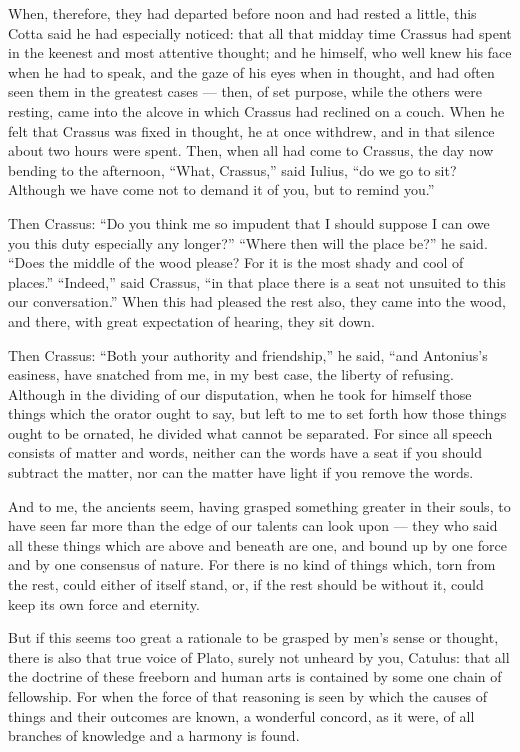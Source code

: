  When, therefore, they had departed before noon and had rested a little, this Cotta said he had especially noticed: that all that midday time Crassus had spent in the keenest and most attentive thought; and he himself, who well knew his face when he had to speak, and the gaze of his eyes when in thought, and had often seen them in the greatest cases — then, of set purpose, while the others were resting, came into the alcove in which Crassus had reclined on a couch. When he felt that Crassus was fixed in thought, he at once withdrew, and in that silence about two hours were spent. Then, when all had come to Crassus, the day now bending to the afternoon, ``What, Crassus,'' said Iulius, ``do we go to sit? Although we have come not to demand it of you, but to remind you.''

 Then Crassus: ``Do you think me so impudent that I should suppose I can owe you this duty especially any longer?'' ``Where then will the place be?'' he said. ``Does the middle of the wood please? For it is the most shady and cool of places.'' ``Indeed,'' said Crassus, ``in that place there is a seat not unsuited to this our conversation.'' When this had pleased the rest also, they came into the wood, and there, with great expectation of hearing, they sit down.

 Then Crassus: ``Both your authority and friendship,'' he said, ``and Antonius's easiness, have snatched from me, in my best case, the liberty of refusing. Although in the dividing of our disputation, when he took for himself those things which the orator ought to say, but left to me to set forth how those things ought to be ornated, he divided what cannot be separated. For since all speech consists of matter and words, neither can the words have a seat if you should subtract the matter, nor can the matter have light if you remove the words.

 And to me, the ancients seem, having grasped something greater in their souls, to have seen far more than the edge of our talents can look upon — they who said all these things which are above and beneath are one, and bound up by one force and by one consensus of nature. For there is no kind of things which, torn from the rest, could either of itself stand, or, if the rest should be without it, could keep its own force and eternity.

 But if this seems too great a rationale to be grasped by men's sense or thought, there is also that true voice of Plato, surely not unheard by you, Catulus: that all the doctrine of these freeborn and human arts is contained by some one chain of fellowship. For when the force of that reasoning is seen by which the causes of things and their outcomes are known, a wonderful concord, as it were, of all branches of knowledge and a harmony is found.

